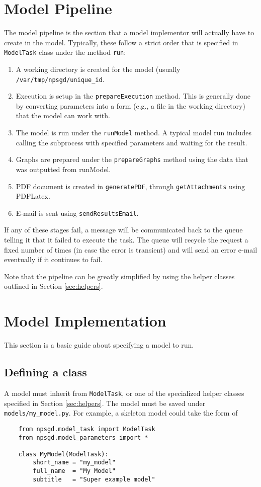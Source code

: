 \documentclass{article}
\newcommand{\mpath}[1]{\texttt{#1}}
\newcommand{\mclass}[1]{\texttt{#1}}
\newcommand{\mmethod}[1]{\texttt{#1}}
\begin{document}
\section{Model Pipeline}
\label{sec:ModelPipeline}
The model pipeline is the section that a model implementor will actually have to
create in the model. Typically, these follow a strict order that is specified in
\mclass{ModelTask} class under the method \mmethod{run}:
\begin{enumerate}
    \item A working directory is created for the model (usually
    \mpath{/var/tmp/npsgd/unique\_id}. 
    \item Execution is setup in the \mmethod{prepareExecution} method. This is
    generally done by converting parameters into a form (e.g., a file in the
    working directory) that the model can work with.
    \item The model is run under the \mmethod{runModel} method. A typical model
    run includes calling the subprocess with specified parameters and waiting
    for the result.
    \item Graphs are prepared under the \mmethod{prepareGraphs} method using the
    data that was outputted from runModel.
    \item PDF document is created in \mmethod{generatePDF}, through
    \mmethod{getAttachments} using PDFLatex. 
    \item E-mail is sent using \mmethod{sendResultsEmail}.
\end{enumerate}

If any of these stages fail, a message will be communicated back to the queue
telling it that it failed to execute the task. The queue will recycle the request a
fixed number of times (in case the error is transient) and will send an error
e-mail eventually if it continues to fail.

Note that the pipeline can be greatly simplified by using the helper classes 
outlined in Section \ref{sec:helpers}.

\section{Model Implementation}
This section is a basic guide about specifying a model to run.

\subsection{Defining a class}
A model must inherit from \mclass{ModelTask}, or one of
the specialized helper classes specified in Section \ref{sec:helpers}. The model
must be saved under \mpath{models/my\_model.py}. For example, a skeleton
model could take the form of
\begin{lstlisting}
    from npsgd.model_task import ModelTask
    from npsgd.model_parameters import *

    class MyModel(ModelTask):
        short_name = "my_model"
        full_name  = "My Model"
        subtitle   = "Super example model"
\end{lstlisting}
\end{document}
